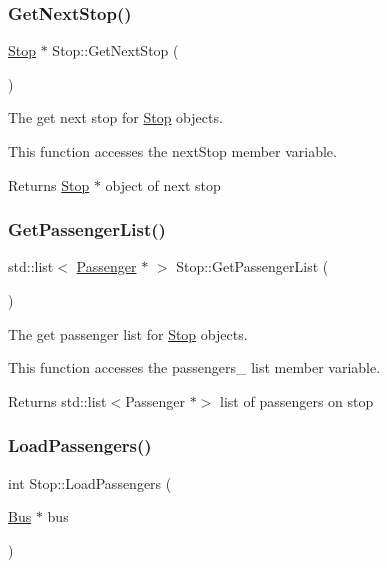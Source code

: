 \subsubsection{\texorpdfstring{Get\+Next\+Stop()}{GetNextStop()}}
{\footnotesize\ttfamily \hyperlink{classStop}{Stop} $\ast$ Stop\+::\+Get\+Next\+Stop (\begin{DoxyParamCaption}{ }\end{DoxyParamCaption})}



The get next stop for \hyperlink{classStop}{Stop} objects. 

This function accesses the next\+Stop member variable.

\begin{DoxyReturn}{Returns}
\hyperlink{classStop}{Stop} $\ast$ object of next stop 
\end{DoxyReturn}
\mbox{\label{classStop_a57c093d381664512dd576cf02a88bea6}} 
\subsubsection{\texorpdfstring{Get\+Passenger\+List()}{GetPassengerList()}}
{\footnotesize\ttfamily std\+::list$<$ \hyperlink{classPassenger}{Passenger} $\ast$ $>$ Stop\+::\+Get\+Passenger\+List (\begin{DoxyParamCaption}{ }\end{DoxyParamCaption})}



The get passenger list for \hyperlink{classStop}{Stop} objects. 

This function accesses the passengers\+\_\+ list member variable.

\begin{DoxyReturn}{Returns}
std\+::list$<$\+Passenger $\ast$$>$ list of passengers on stop 
\end{DoxyReturn}
\mbox{\label{classStop_a02c6dcba2b6de5fdd008cf623f19bf7c}} 
\subsubsection{\texorpdfstring{Load\+Passengers()}{LoadPassengers()}}
{\footnotesize\ttfamily int Stop\+::\+Load\+Passengers (\begin{DoxyParamCaption}\item[{\hyperlink{classBus}{Bus} $\ast$}]{bus }\end{DoxyParamCaption})}



